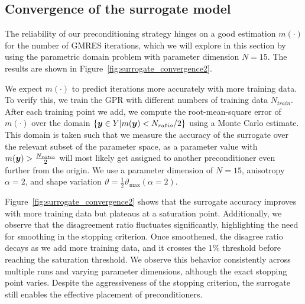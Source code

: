 \subsection{Convergence of the surrogate model}\label{subsec:gpr_reliability_experiment}
The reliability of our preconditioning strategy hinges on a good estimation $m(\cdot)$ for the number of GMRES iterations, which we will explore in this section by using the parametric domain problem with parameter dimension $N=15$.
The results are shown in Figure~\ref{fig:surrogate_convergence2}.

We expect $m(\cdot)$ to predict iterations more accurately with more training data.
To verify this, we train the GPR with different numbers of training data $N_{train}$.
After each training point we add, we compute the root-mean-square error of $m(\cdot)$ over the domain $\{{\bm{y}} \in Y | m({\bm{y}}) < N_{ratio} / 2\}$ using a Monte Carlo estimate.
This domain is taken such that we measure the accuracy of the surrogate over the relevant subset of the parameter space, as a parameter value with $m({\bm{y}})>\frac{N_{ratio}}{2}$ will most likely get assigned to another preconditioner even further from the origin.
We use a parameter dimension of $N=15$, anisotropy $\alpha=2$, and shape variation $\vartheta=\frac{1}{2}\vartheta_{\max}(\alpha=2)$.

Figure~\ref{fig:surrogate_convergence2} shows that the surrogate accuracy improves with more training data but plateaus at a saturation point.
Additionally, we observe that the disagreement ratio fluctuates significantly, highlighting the need for smoothing in the stopping criterion.
Once smoothened, the disagree ratio decays as we add more training data, and it crosses the $1\%$ threshold before reaching the saturation threshold.
We observe this behavior consistently across multiple runs and varying parameter dimensions, although the exact stopping point varies.
Despite the aggressiveness of the stopping criterion, the surrogate still enables the effective placement of preconditioners.

